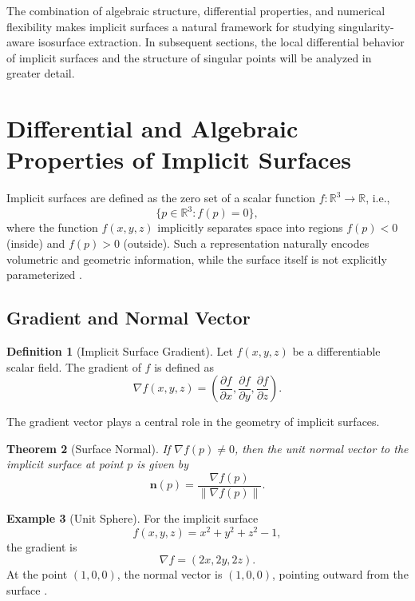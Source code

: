 \documentclass[12pt, a4paper, oneside]{book}
\theoremstyle{plain}
\newtheorem{theorem}{Theorem}[chapter]
\theoremstyle{definition}
\newtheorem{definition}[theorem]{Definition}
\newtheorem{example}[theorem]{Example}
\theoremstyle{remark}
\theoremstyle{definition}
\begin{document}
The combination of algebraic structure, differential properties, and numerical flexibility makes implicit surfaces a natural framework for studying singularity-aware isosurface extraction. In subsequent sections, the local differential behavior of implicit surfaces and the structure of singular points will be analyzed in greater detail.

\section{Differential and Algebraic Properties of Implicit Surfaces}

Implicit surfaces are defined as the zero set of a scalar function $f:\mathbb{R}^3 \rightarrow \mathbb{R}$, i.e.,
\[
\{ p \in \mathbb{R}^3 : f(p) = 0 \},
\]
where the function $f(x,y,z)$ implicitly separates space into regions $f(p) < 0$ (inside) and $f(p) > 0$ (outside). Such a representation naturally encodes volumetric and geometric information, while the surface itself is not explicitly parameterized \cite{bloomenthal2000implicit}.

\subsection{Gradient and Normal Vector}

\begin{definition}[Implicit Surface Gradient]
Let $f(x,y,z)$ be a differentiable scalar field. The gradient of $f$ is defined as
\[
\nabla f(x,y,z) = \left(\frac{\partial f}{\partial x}, \frac{\partial f}{\partial y}, \frac{\partial f}{\partial z}\right).
\]
\end{definition}

The gradient vector plays a central role in the geometry of implicit surfaces.

\begin{theorem}[Surface Normal]
If $\nabla f(p) \neq 0$, then the unit normal vector to the implicit surface at point $p$ is given by
\[
\mathbf{n}(p) = \frac{\nabla f(p)}{\|\nabla f(p)\|}.
\]
\end{theorem}

\begin{example}[Unit Sphere]
For the implicit surface
\[
f(x,y,z) = x^2 + y^2 + z^2 - 1,
\]
the gradient is
\[
\nabla f = (2x,2y,2z).
\]
At the point $(1,0,0)$, the normal vector is $(1,0,0)$, pointing outward from the surface \cite{bloomenthal2000implicit}.
\end{example}
\end{document}
